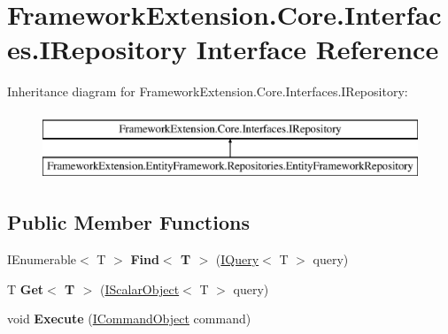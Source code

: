 \hypertarget{interface_framework_extension_1_1_core_1_1_interfaces_1_1_i_repository}{\section{Framework\-Extension.\-Core.\-Interfaces.\-I\-Repository Interface Reference}
\label{interface_framework_extension_1_1_core_1_1_interfaces_1_1_i_repository}
}
Inheritance diagram for Framework\-Extension.\-Core.\-Interfaces.\-I\-Repository\-:\begin{figure}[H]
\begin{center}
\leavevmode
\includegraphics[height=2.000000cm]{interface_framework_extension_1_1_core_1_1_interfaces_1_1_i_repository}
\end{center}
\end{figure}
\subsection*{Public Member Functions}
\begin{DoxyCompactItemize}
\item 
\hypertarget{interface_framework_extension_1_1_core_1_1_interfaces_1_1_i_repository_ade00c49cbf4c15c6fcd358266f91d507}{I\-Enumerable$<$ T $>$ {\bfseries Find$<$ T $>$} (\hyperlink{interface_framework_extension_1_1_core_1_1_interfaces_1_1_i_query-g}{I\-Query}$<$ T $>$ query)}\label{interface_framework_extension_1_1_core_1_1_interfaces_1_1_i_repository_ade00c49cbf4c15c6fcd358266f91d507}

\item 
\hypertarget{interface_framework_extension_1_1_core_1_1_interfaces_1_1_i_repository_aee59bce54af0de81a434a54e2726aa85}{T {\bfseries Get$<$ T $>$} (\hyperlink{interface_framework_extension_1_1_core_1_1_interfaces_1_1_i_scalar_object-g}{I\-Scalar\-Object}$<$ T $>$ query)}\label{interface_framework_extension_1_1_core_1_1_interfaces_1_1_i_repository_aee59bce54af0de81a434a54e2726aa85}

\item 
\hypertarget{interface_framework_extension_1_1_core_1_1_interfaces_1_1_i_repository_a75a06316c9cb660a2a3fa8d1d2156e9b}{void {\bfseries Execute} (\hyperlink{interface_framework_extension_1_1_core_1_1_interfaces_1_1_i_command_object}{I\-Command\-Object} command)}\label{interface_framework_extension_1_1_core_1_1_interfaces_1_1_i_repository_a75a06316c9cb660a2a3fa8d1d2156e9b}

\end{DoxyCompactItemize}
